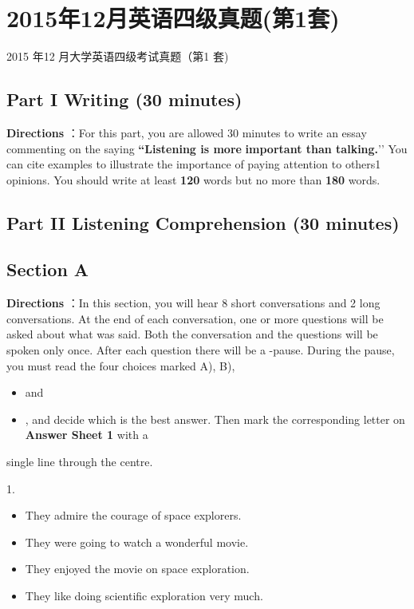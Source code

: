 \documentclass[UTF8,11pt]{ctexart}
\begin{document}
\section*{2015年12月英语四级真题(第1套)}
2015 年12 月大学英语四级考试真题（第1 套)


\subsection*{\textbf{Part I} \textbf{Writing} \textbf{(30 minutes)}}


\textbf{Directions} ：For this part, you are allowed 30 minutes to write an essay commenting on the saying\textbf{ “Listening is more} \textbf{important than talking.}’’ You can cite examples to illustrate the importance of paying attention to others1 opinions. You should write at least\textbf{ 120} words but no more than\textbf{ 180} words.


\subsection*{\textbf{Part} II \textbf{Listening Comprehension} \textbf{(30 minutes)}}


\subsection*{\textbf{Section A}}


\textbf{Directions} ：In this section, you will hear 8 short conversations and 2 long conversations. At the end of each conversation, one or more questions will be asked about what was said. Both the conversation and the questions will be spoken only once. After each question there will be a -pause. During the pause, you must read the four choices marked A), B),


\begin{itemize}[leftmargin=2em,itemsep=.2em,topsep=.4em]\item[C.] and
\item[D.] , and decide which is the best answer. Then mark the corresponding letter on\textbf{ Answer Sheet 1} with a
\end{itemize}

single line through the centre.


1.


\begin{itemize}[leftmargin=2em,itemsep=.2em,topsep=.4em]\item[A.] They admire the courage of space explorers.
\item[B.] They were going to watch a wonderful movie.
\item[C.] They enjoyed the movie on space exploration.
\item[D.] They like doing scientific exploration very much.
\end{itemize}
\end{document}

